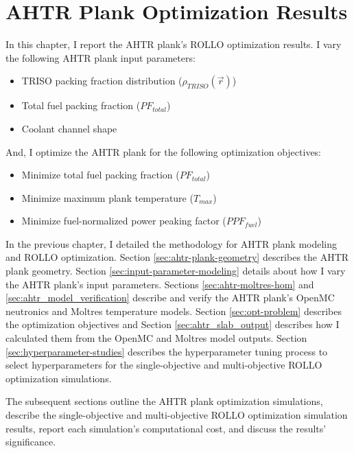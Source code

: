 \chapter{AHTR Plank Optimization Results}
\glsresetall
\label{chap:ahtr-plank-opt-results}
In this chapter, I report the \gls{AHTR} plank's \gls{ROLLO} optimization results. 
I vary the following \gls{AHTR} plank input parameters:
\begin{itemize}
    \item \gls{TRISO} packing fraction distribution ($\rho_{TRISO}(\vec{r})$)
    \item Total fuel packing fraction ($PF_{total}$)
    \item Coolant channel shape
\end{itemize} 
And, I optimize the \gls{AHTR} plank for the following optimization objectives:
\begin{itemize}
    \item Minimize total fuel packing fraction ($PF_{total}$)
    \item Minimize maximum plank temperature ($T_{max}$)
    \item Minimize fuel-normalized power peaking factor ($PPF_{fuel}$)
\end{itemize} 

In the previous chapter, I detailed the methodology for \gls{AHTR} plank modeling and 
\gls{ROLLO} optimization. 
Section \ref{sec:ahtr-plank-geometry} describes the \gls{AHTR} plank geometry.
Section \ref{sec:input-parameter-modeling} details about how I vary the 
\gls{AHTR} plank's input parameters. 
Sections \ref{sec:ahtr-moltres-hom} and \ref{sec:ahtr_model_verification}
describe and verify the \gls{AHTR} plank's OpenMC neutronics and Moltres 
temperature models. 
Section \ref{sec:opt-problem} describes the optimization objectives and Section 
\ref{sec:ahtr_slab_output} describes how I calculated them from the OpenMC and Moltres 
model outputs. 
Section \ref{sec:hyperparameter-studies} describes the hyperparameter tuning process 
to select hyperparameters for the single-objective and multi-objective \gls{ROLLO} 
optimization simulations.

The subsequent sections outline the \gls{AHTR} plank optimization simulations, describe 
the single-objective and multi-objective \gls{ROLLO} optimization simulation results, 
report each simulation's computational cost, and discuss the results' 
significance.

